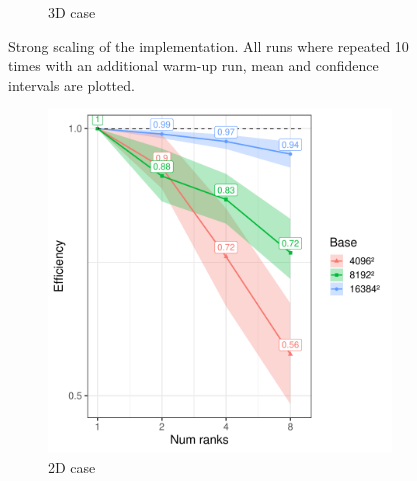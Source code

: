 \begin{figure}
\begin{subfigure}{0.49\textwidth}
        \caption{3D case}
        \label{fig:scalingStrong3D}
    \end{subfigure}
    \caption{Strong scaling of the implementation. All runs where repeated 10 times with an additional warm-up run, mean and confidence intervals are plotted.}
    \label{fig:scalingStrong}
\end{figure}
\begin{figure}
    \centering
    \begin{subfigure}{0.49\textwidth}
        \centering
        \includegraphics[width=\linewidth]{figures/experiments/scaling_weak_2d.pdf}
        \caption{2D case}
        \label{fig:scalingWeak2D}
    \end{subfigure}
    \begin{subfigure}{0.49\textwidth}
        \centering

\end{subfigure}
\end{figure}
